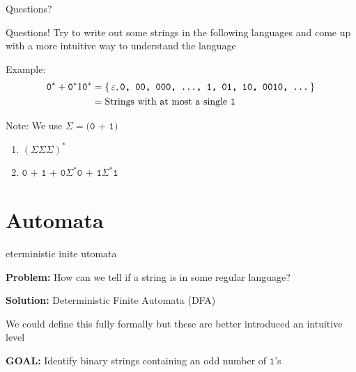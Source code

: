 \documentclass[aspectratio=169, handout]{beamer}
\begin{document}
\begin{frame}{}
      \begin{center}
    {\color{sigma@mainblue} \LARGE Questions?}
  \end{center}
\end{frame}

\begin{frame}{Questions!}
    Try to write out some strings in the following languages and come up with a more intuitive way to understand the language
    
    Example: 
    \begin{align*}
    \texttt{0}^* + \texttt{0}^* 1 \texttt{0}^* &= \set{\varepsilon, \texttt{0, 00, 000, \ldots, 1, 01, 10, 0010, \ldots}} \\
        &= \text{Strings with at most a single }\texttt{1}
    \end{align*}
    
    Note: We use $\Sigma = \texttt{(0 +  1)}$ \pause
    
    \begin{enumerate}
        \item $( \Sigma \Sigma \Sigma)^*$
        \item $\texttt{0 + 1 + 0} \Sigma^* \texttt{0 + 1} \Sigma^* \texttt{1}$
    \end{enumerate}
\end{frame}

\section{Automata}
\frame{\sectionpage}

\begin{frame}{eterministic inite utomata}

\textbf{Problem:} How can we tell if a string is in some regular language? \pause


\textbf{Solution:} Deterministic Finite Automata (DFA)

\end{frame}

\begin{frame}{}
    We could define this fully formally but these are better introduced an intuitive level \pause
    
    \textbf{GOAL: } Identify binary strings containing an odd number of $\texttt{1}$'s
\end{frame}
\end{document}
